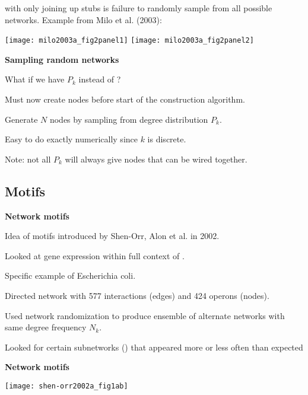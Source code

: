 \begin{frame}[label=]
\begin{frame}[label=]
\begin{frame}[label=]
\begin{frame}[label=]
\begin{frame}[label=]
\begin{frame}[label=]
  
    with only joining up stubs
    is \alert{failure} to randomly sample from all possible networks.
   Example from Milo et al. (2003)\cite{milo2003a}:
          
      
      \texttt{[image: milo2003a\_fig2panel1]}
      \texttt{[image: milo2003a\_fig2panel2]}
      



\begin{frame}[label=]
  \textbf{Sampling random networks}
  
  
    What if we have \alert{$P_k$} instead of ?
  
    Must now create nodes before start of the construction algorithm.
  
    Generate $N$ nodes by sampling from degree distribution $P_k$.
   
    Easy to do exactly numerically since $k$ is discrete.
   
    \alert{Note:} not all $P_k$ will always give nodes
    that can be wired together.
  


\subsection{Motifs}

\begin{frame}[label=]
  \textbf{Network motifs}

  
   
    Idea of \alert{motifs}\cite{shen-orr2002a} 
    introduced by Shen-Orr, Alon et al. in 2002.
   
    Looked at gene expression within full context of
    .
   
    Specific example of Escherichia coli.
   
    Directed network with 577 interactions (edges) and 424 operons (nodes).
   
    Used network randomization to produce ensemble of alternate networks
    with same degree frequency $N_k$.
   
    Looked for \alert{certain subnetworks} () that appeared more or less often than expected
  
  

\begin{frame}[label=]
  \textbf{Network motifs}

          
      \texttt{[image: shen-orr2002a\_fig1ab]}
      

\end{frame}
\end{frame}
\end{frame}
\end{frame}
\end{frame}
\end{frame}
\end{frame}
\end{frame}
\end{frame}
